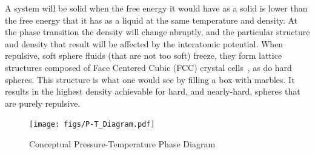 \documentclass[double,12pt]{beavtex}
\begin{document}
 
A system will be solid when the free energy it would have as a solid is lower 
than the free energy that it has as a liquid at the same temperature and density.
At the phase transition the density will change abruptly, and
the particular structure and density that result will be affected 
by the interatomic potential. When repulsive, soft sphere fluids 
(that are not too soft) freeze, they form lattice structures composed of 
Face Centered Cubic (FCC) crystal cells~\cite{Hansen}, as do hard spheres. 
This structure is what one would see by filling a box with marbles. It 
results in the highest density achievable for hard, and nearly-hard, spheres 
that are purely repulsive. 

\begin{figure}
    \centering
    \texttt{[image: figs/P-T\_Diagram.pdf]}
    \caption{Conceptual Pressure-Temperature Phase Diagram}
    \label{fig:P-T_Diagram}
\end{figure}
\end{document}
